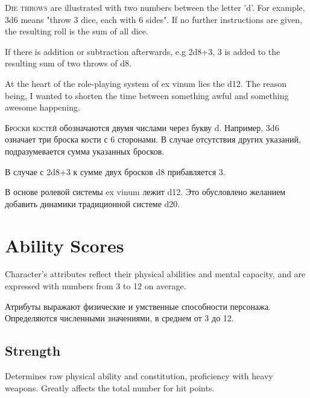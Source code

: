 \documentclass[a5paper,11pt]{book}
\begin{document}
\begin{multicols}{2}

\begin{en}
\lettrine{D}{ie throws} are illustrated with two numbers between the letter 'd'. For example, 3d6 means "throw 3 dice, each with 6 sides". If no further instructions are given, the resulting roll is the sum of all dice.

If there is addition or subtraction afterwards, e.g 2d8+3, 3 is added to the resulting sum of two throws of d8.

At the heart of the role-playing system of ex vinum lies the d12. The reason being, I wanted to shorten the time between something awful and something awesome happening.
\end{en}

\begin{ru}
\lettrine{Б}{роски костей} обозначаются двумя числами через букву d. Например, 3d6 означает три броска кости с 6 сторонами. В случае отсутствия других указаний, подразумевается сумма указанных бросков.

В случае с 2d8+3 к сумме двух бросков d8 прибавляется 3.

В основе ролевой системы ex vinum лежит d12. Это обусловлено желанием добавить динамики традиционной системе d20.
\end{ru}

\section{Ability Scores}
\begin{en}
Character's attributes reflect their physical abilities and mental capacity, and are expressed with numbers from 3 to 12 on average.
\end{en}

\begin{ru}
Атрибуты выражают физические и умственные способности персонажа. Определяются численными значениями, в среднем от 3 до 12.
\end{ru}

\subsection{Strength}
\begin{en}
Determines raw physical ability and constitution, proficiency with heavy weapons. Greatly affects the total number for hit points.
\end{en}


\end{multicols}
\end{document}
